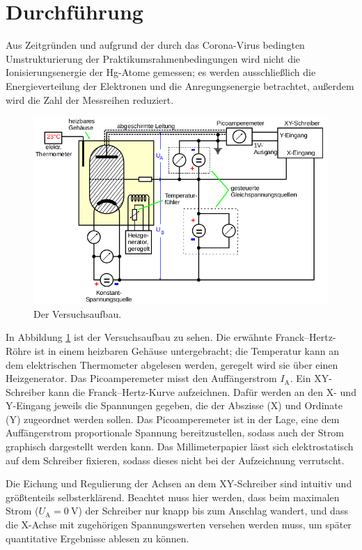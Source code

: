 \section{Durchführung}
\label{sec:Durchführung}

Aus Zeitgründen und aufgrund der durch das Corona-Virus bedingten Umstrukturierung der Praktikumsrahmenbedingungen 
wird nicht die Ionisierungsenergie der Hg-Atome gemessen; es werden ausschließlich die Energieverteilung der Elektronen 
und die Anregungsenergie betrachtet, außerdem wird die Zahl der Messreihen reduziert. 

\begin{figure}
    \centering
    \includegraphics[width=\textwidth]{plots/Aufbau.png}
    \caption{Der Versuchsaufbau\cite{Versuchsanleitung}.}
    \label{fig:Aufbau}
\end{figure}
In Abbildung \ref{fig:Aufbau} ist der Versuchsaufbau zu sehen. 
Die erwähnte Franck--Hertz-Röhre ist in einem heizbaren Gehäuse untergebracht; die Temperatur kann an dem elektrischen 
Thermometer abgelesen werden, geregelt wird sie über einen Heizgenerator. 
Das Picoamperemeter misst den Auffängerstrom $I_\text{A}$.
Ein XY-Schreiber kann die Franck--Hertz-Kurve aufzeichnen. Dafür werden an den X- und Y-Eingang jeweils die Spannungen 
gegeben, die der Abszisse (X) und Ordinate (Y) zugeordnet werden sollen. 
Das Picoamperemeter ist in der Lage, eine dem Auffängerstrom proportionale Spannung bereitzustellen, sodass auch der 
Strom graphisch dargestellt werden kann. 
Das Millimeterpapier lässt sich elektrostatisch auf dem Schreiber fixieren, sodass dieses nicht bei der Aufzeichnung verrutscht. 

Die Eichung und Regulierung der Achsen an dem XY-Schreiber sind intuitiv und größtenteils selbsterklärend. 
Beachtet muss hier werden, dass beim maximalen Strom ($U_\text{A}=\SI{0}{\volt}$) der Schreiber nur knapp bis zum 
Anschlag wandert, und dass die X-Achse mit zugehörigen Spannungswerten versehen werden muss, um später quantitative Ergebnisse 
ablesen zu können. 
\\

